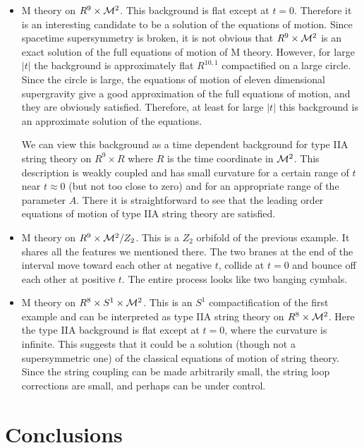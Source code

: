\documentclass[a4paper,12pt,oneside]{article}
\begin{document}
\begin{itemize}
\item
M theory on $R^9\times {\cal M}^2$.  This background is flat
except at $t=0$.  Therefore it is an interesting candidate to be a
solution of the equations of motion.  Since spacetime
supersymmetry is broken, it is not obvious that $R^9\times {\cal
M}^2$ is an exact solution of the full equations of motion of M
theory.  However, for large $|t|$ the background is approximately
flat $R^{10,1}$ compactified on a large circle. Since the circle
is large, the equations of motion of eleven dimensional
supergravity give a good approximation of the full equations of
motion, and they are obviously satisfied.  Therefore, at least
for large $|t|$ this background is an approximate solution of the
equations.

We can view this background as a time dependent background for
type IIA string theory on $R^9\times R$ where $R$ is the time
coordinate in ${\cal M}^2$. This description is weakly coupled
and has small curvature for a certain range of $t$ near $t\approx
0$ (but not too close to zero) and for an appropriate range of the
parameter $A$.  There it is straightforward to see that the
leading order equations of motion of type IIA string theory are
satisfied.

\item
M theory on $R^9\times {\cal M}^2/Z_2$.  This is a $Z_2$ orbifold
of the previous example.  It shares all the features we mentioned
there.  The two branes at the end of the interval move toward
each other at negative $t$, collide at $t=0$ and bounce off each
other at positive $t$.  The entire process looks like two banging
cymbals.

\item
M theory on $R^8\times S^1\times {\cal M}^2$.  This is an $S^1$
compactification of the first example and can be interpreted as
type IIA string theory on $R^8\times {\cal M}^2$.  Here the type
IIA background is flat except at $t=0$, where the curvature is
infinite. This suggests that it could be a solution (though not a
supersymmetric one) of the classical equations of motion of string
theory. Since the string coupling can be made arbitrarily small,
the string loop corrections are small, and perhaps can be under
control.

\end{itemize}

\setcounter{equation}{0}
\section{Conclusions}
\end{document}
